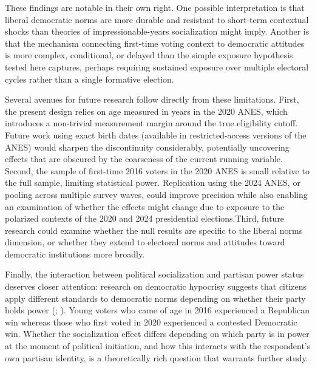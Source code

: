 \documentclass[
  10pt,
  letterpaper,
  DIV=11,
  numbers=noendperiod]{scrartcl}
\begin{document}
These findings are notable in their own right. One possible
interpretation is that liberal democratic norms are more durable and
resistant to short-term contextual shocks than theories of
impressionable-years socialization might imply. Another is that the
mechanism connecting first-time voting context to democratic attitudes
is more complex, conditional, or delayed than the simple exposure
hypothesis tested here captures, perhaps requiring sustained exposure
over multiple electoral cycles rather than a single formative election.

Several avenues for future research follow directly from these
limitations. First, the present design relies on age measured in years
in the 2020 ANES, which introduces a non-trivial measurement margin
around the true eligibility cutoff. Future work using exact birth dates
(available in restricted-access versions of the ANES) would sharpen the
discontinuity considerably, potentially uncovering effects that are
obscured by the coarseness of the current running variable. Second, the
sample of first-time 2016 voters in the 2020 ANES is small relative to
the full sample, limiting statistical power. Replication using the 2024
ANES, or pooling across multiple survey waves, could improve precision
while also enabling an examination of whether the effects might change
due to exposure to the polarized contexts of the 2020 and 2024
presidential elections.Third, future research could examine whether the
null results are specific to the liberal norms dimension, or whether
they extend to electoral norms and attitudes toward democratic
institutions more broadly.

Finally, the interaction between political socialization and partisan
power status deserves closer attention: research on democratic hypocrisy
suggests that citizens apply different standards to democratic norms
depending on whether their party holds power
(;
). Young voters
who came of age in 2016 experienced a Republican win whereas those who
first voted in 2020 experienced a contested Democratic win. Whether the
socialization effect differs depending on which party is in power at the
moment of political initiation, and how this interacts with the
respondent's own partisan identity, is a theoretically rich question
that warrants further study.

\newpage{}

\newpage{}
\end{document}
